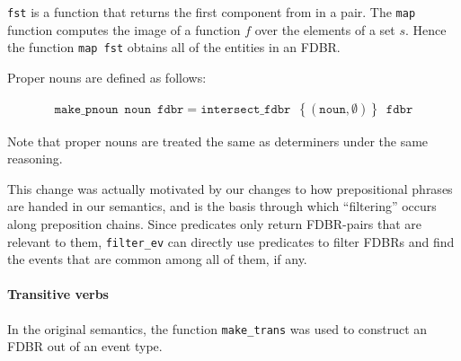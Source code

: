 \documentclass[../main.tex]{subfiles}
\begin{document}
\texttt{fst} is a function that returns the first component from in a pair.  The \texttt{map} function computes the image of a function $f$ over the elements of a set $s$.  
Hence the function \texttt{map fst} obtains all of the entities in an FDBR.

Proper nouns are defined as follows:

\begin{gather*}
\mathtt{make\_pnoun}\enspace \mathtt{noun}\enspace \mathtt{fdbr} = \mathtt{intersect\_fdbr}\enspace \left\{(\mathtt{noun}, \mathtt{\emptyset})\right\} \enspace\mathtt{fdbr}
\end{gather*}

Note that proper nouns are treated the same as determiners under the same reasoning.

This change was actually motivated by our changes to how prepositional phrases are handed in our semantics, and is the basis through which
``filtering'' occurs along preposition chains.  Since predicates only return FDBR-pairs that are relevant to them, \texttt{filter\_ev} can directly
use predicates to filter FDBRs and find the events that are common among all of them, if any.

\paragraph{Transitive verbs}

In the original semantics, the function \texttt{make\_trans} was used to
construct an FDBR out of an event type.
\end{document}
